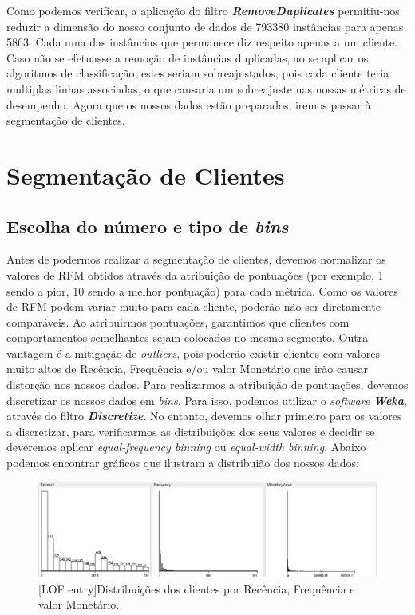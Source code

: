 \documentclass{easychair}
\begin{document}
Como podemos verificar, a aplicação do filtro \textit{\textbf{RemoveDuplicates}} permitiu-nos reduzir a dimensão do nosso conjunto de dados de 793380 instâncias para apenas 5863. Cada uma das instâncias que permanece diz respeito apenas a um cliente. Caso não se efetuasse a remoção de instâncias duplicadas, ao se aplicar os algoritmos de classificação, estes seriam sobreajustados, pois cada cliente teria multiplas linhas associadas, o que causaria um sobreajuste nas nossas métricas de desempenho.
Agora que os nossos dados estão preparados, iremos passar à segmentação de clientes.



\section{Segmentação de Clientes}
\subsection{Escolha do número e tipo de \textit{bins}}

Antes de podermos realizar a segmentação de clientes, devemos normalizar os valores de RFM obtidos através da atribuição de pontuações (por exemplo, 1 sendo a pior, 10 sendo a melhor pontuação) para cada métrica. Como os valores de RFM podem variar muito para cada cliente, poderão não ser diretamente comparáveis. Ao atribuirmos pontuações, garantimos que clientes com comportamentos semelhantes sejam colocados no mesmo segmento. Outra vantagem é a mitigação de \textit{outliers}, pois poderão existir clientes com valores muito altos de Recência, Frequência e/ou valor Monetário que irão causar distorção nos nossos dados.
Para realizarmos a atribuição de pontuações, devemos discretizar os nossos dados em \textit{bins}. Para isso, podemos utilizar o \textit{software} \textit{\textbf{Weka}}, através do filtro \textit{\textbf{Discretize}}. No entanto, devemos olhar primeiro para os valores a discretizar, para verificarmos as distribuições dos seus valores e decidir se deveremos aplicar \textit{equal-frequency binning} ou \textit{equal-width binning}. Abaixo podemos encontrar gráficos que ilustram a distribuião dos nossos dados:

 \begin{figure}[H]
    \begin{centering}
    \includegraphics[width=1\linewidth]{imagens/figure6.jpg}\label{cap-3-fig6}
    [LOF entry]{Distribuições dos clientes por Recência, Frequência e valor Monetário.}
    \label{fig6}
    \end{centering}
\end{figure}
\end{document}
